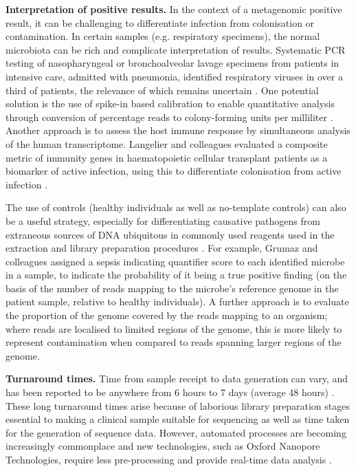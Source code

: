 \textbf{Interpretation of positive results.} In the context of a metagenomic positive result, it can be challenging to differentiate infection from colonisation or contamination. In certain samples (e.g. respiratory specimens), the normal microbiota can be rich and complicate interpretation of results. Systematic PCR testing of nasopharyngeal or bronchoalveolar lavage specimens from patients in intensive care, admitted with pneumonia, identified respiratory viruses in over a third of patients, the relevance of which remains uncertain \parencite{Choi2012}. One potential solution is the use of spike-in based calibration to enable quantitative analysis through conversion of percentage reads to colony-forming units per milliliter \parencite{Stammler2016}. Another approach is to assess the host immune response by simultaneous analysis of the human transcriptome. Langelier and colleagues evaluated a composite metric of immunity genes in haematopoietic cellular transplant patients as a biomarker of active infection, using this to differentiate colonisation from active infection \parencite{Langelier2018}. 

The use of controls (healthy individuals as well as no-template controls) can also be a useful strategy, especially for differentiating causative pathogens from extraneous sources of DNA ubiquitous in commonly used reagents used in the extraction and library preparation procedures \parencite{Salter2014}. For example, Grumaz and colleagues \parencite{Grumaz2016} assigned a sepsis indicating quantifier score to each identified microbe in a sample, to indicate the probability of it being a true positive finding (on the basis of the number of reads mapping to the microbe's reference genome in the patient sample, relative to healthy individuals). A further approach is to evaluate the proportion of the genome covered by the reads mapping to an organism; where reads are localised to limited regions of the genome, this is more likely to represent contamination when compared to reads spanning larger regions of the genome.

\textbf{Turnaround times.} Time from sample receipt to data generation can vary, and has been reported to be anywhere from 6 hours to 7 days (average 48 hours) \parencite{Simner2018}. These long turnaround times arise because of laborious library preparation stages essential to making a clinical sample suitable for sequencing as well as time taken for the generation of sequence data. However, automated processes are becoming increasingly commonplace and new technologies, such as Oxford Nanopore Technologies, require less pre-processing and provide real-time data analysis \parencite{Quick2016}. 

